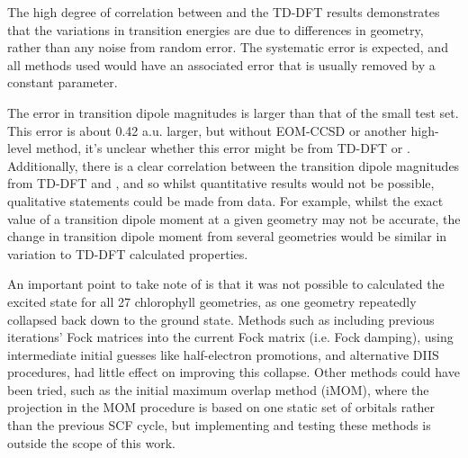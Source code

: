 The high degree of correlation between \dscf and the TD-DFT results demonstrates
that the variations in transition energies are due to differences in geometry, rather
than any noise from random error. The systematic error is expected, and all methods
used would have an associated error that is usually removed by a constant parameter.

The error in transition dipole magnitudes is larger than that of the small
test set. This error is about 0.42 a.u. larger, but without EOM-CCSD or another
high-level method, it's unclear whether this error might be from TD-DFT or \dscf.
Additionally, there is a clear correlation between the transition dipole magnitudes
from TD-DFT and \dscf, and so whilst quantitative results would not be possible, 
qualitative statements could be made from \dscf data. For example, whilst the exact 
value of a transition dipole moment at a given geometry may not be accurate, the
change in transition dipole moment from several geometries would be similar in
variation to TD-DFT calculated properties.

An important point to take note of is that it was not possible to calculated the 
excited state for all 27 chlorophyll geometries, as one geometry repeatedly collapsed back
down to the ground state. Methods such as including previous iterations' Fock matrices
into the current Fock matrix (i.e. Fock damping), using intermediate initial guesses like 
half-electron promotions, and alternative DIIS procedures, had little effect on 
improving this collapse. Other methods could have been tried, such as the initial
maximum overlap method (iMOM), where the projection in the MOM procedure is based 
on one static set of orbitals rather than the previous SCF cycle, but implementing
and testing these methods is outside the scope of this work.

\afterpartskip
